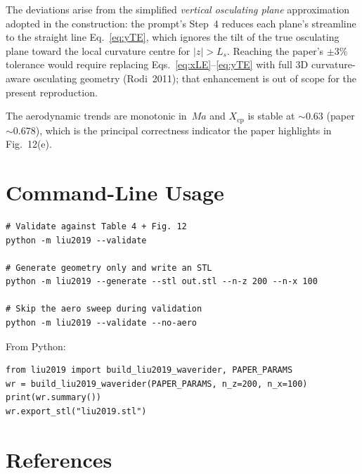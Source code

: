 \documentclass[11pt,a4paper]{article}
\newcommand{\Ma}{\mathit{Ma}}
\newcommand{\Ls}{L_{s}}
\begin{document}
The deviations arise from the simplified \emph{vertical osculating
plane} approximation adopted in the construction: the prompt's Step~4
reduces each plane's streamline to the straight line
Eq.~\eqref{eq:yTE}, which ignores the tilt of the true osculating
plane toward the local curvature centre for $|z|>\Ls$. Reaching the
paper's $\pm 3\%$ tolerance would require replacing
Eqs.~\eqref{eq:xLE}--\eqref{eq:yTE} with full 3D curvature-aware
osculating geometry (Rodi~2011); that enhancement is out of scope for
the present reproduction.

The aerodynamic trends are monotonic in~$\Ma$ and $X_{\mathrm{cp}}$ is
stable at $\sim 0.63$ (paper $\sim 0.678$), which is the principal
correctness indicator the paper highlights in Fig.~12(e).

\section{Command-Line Usage}

\begin{lstlisting}
# Validate against Table 4 + Fig. 12
python -m liu2019 --validate

# Generate geometry only and write an STL
python -m liu2019 --generate --stl out.stl --n-z 200 --n-x 100

# Skip the aero sweep during validation
python -m liu2019 --validate --no-aero
\end{lstlisting}

From Python:
\begin{lstlisting}
from liu2019 import build_liu2019_waverider, PAPER_PARAMS
wr = build_liu2019_waverider(PAPER_PARAMS, n_z=200, n_x=100)
print(wr.summary())
wr.export_stl("liu2019.stl")
\end{lstlisting}

\section{References}
\end{document}
